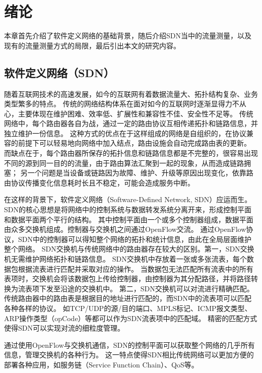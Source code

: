 \chapter{绪论}
本章首先介绍了软件定义网络的基础背景，随后介绍SDN当中的流量测量，以及现有的流量测量方式的局限，最后引出本文的研究内容。
\section{软件定义网络（SDN）}
随着互联网技术的高速发展，如今的互联网有着数据流量大、拓扑结构复杂、业务类型繁多的特点。
传统的网络结构体系在面对如今的互联网时逐渐显得力不从心，主要体现在维护困难、效率低、扩展性和兼容性不佳、安全性不足等。
传统网络中，每个路由器各自为战，通过一定的路由协议互相传递拓扑和链路信息，并独立维护一份信息。
这种方式的优点在于这样组成的网络是自组织的，在协议兼容的前提下可以轻易地向网络中加入结点，路由设施会自动完成路由表的更新。
而缺点在于，每个路由器所保存的拓扑信息和链路信息都是不完整的，很容易出现不同的源到同一目的的流量，由于路由算法汇聚到一起的现象，从而造成链路拥塞\cite{vissicchio2015central}；
另一个问题是当设备或链路因为故障、维护、升级等原因出现变化，依靠路由协议传播变化信息耗时长且不稳定，可能会造成服务中断\cite{xu2018achieving}。

在这样的背景下，软件定义网络（Software-Defined Network, SDN）\cite{mckeown2008openflow}应运而生。
SDN的核心思想是将网络中的控制系统与数据转发系统分离开来，形成控制平面和数据平面两个平行的结构。
其中控制平面由一个或多个控制器组成，数据平面由众多交换机组成。控制器与交换机之间通过OpenFlow交流。
通过OpenFlow协议，SDN中的控制器可以得知整个网络的拓扑和统计信息，由此在全局层面维护整个网络。
SDN交换机与传统网络中的路由器存在较大的区别。第一，SDN交换机无需维护网络拓扑和链路信息。
SDN交换机中存放着一张或多张流表，每个数据包根据流表进行匹配并采取对应的操作。
当数据包无法匹配所有流表中的所有表项时，交换机会将该数据包上传给控制器，由控制器为其分配路径，并将路径转换为流表项下发至沿途的交换机中。
第二，SDN交换机可以对流进行精确匹配。传统路由器中的路由表是根据目的地址进行匹配的，而SDN中的流表项可以匹配各种各样的协议。
如TCP/UDP的源/目的端口、MPLS标记\cite{davie2000mpls}、ICMP报文类型、ARP操作类型（opCode）等都可以作为SDN流表项中的匹配域。
精密的匹配方式使得SDN可以实现对流的细粒度管理\cite{xu2017joint}。

通过使用OpenFlow与交换机通信，SDN的控制平面可以获取整个网络的几乎所有信息，管理交换机的各种行为。
这一特点使得SDN相比传统网络可以更加方便的部署各种应用，如服务链（Service Function Chain）\cite{halpern2015service}、QoS\cite{akella2014quality}等。

